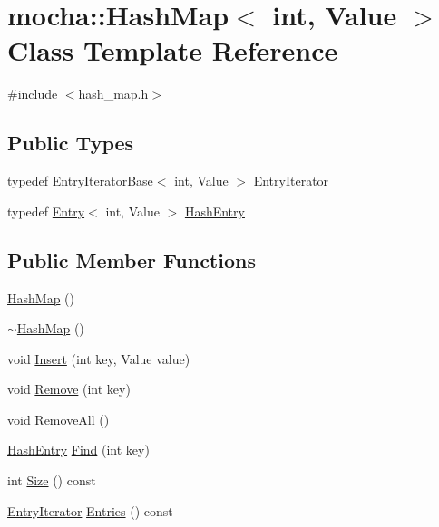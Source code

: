 \hypertarget{classmocha_1_1_hash_map_3_01int_00_01_value_01_4}{
\section{mocha::HashMap$<$ int, Value $>$ Class Template Reference}
\label{classmocha_1_1_hash_map_3_01int_00_01_value_01_4}
}


{\ttfamily \#include $<$hash\_\-map.h$>$}

\subsection*{Public Types}
\begin{DoxyCompactItemize}
\item 
typedef \hyperlink{classmocha_1_1_entry_iterator_base}{EntryIteratorBase}$<$ int, Value $>$ \hyperlink{classmocha_1_1_hash_map_3_01int_00_01_value_01_4_a9db157f397c8b5aa17afecf68c117d4b}{EntryIterator}
\item 
typedef \hyperlink{classmocha_1_1_entry}{Entry}$<$ int, Value $>$ \hyperlink{classmocha_1_1_hash_map_3_01int_00_01_value_01_4_a4b5cb184c5d22d42fe7eb555d983ca56}{HashEntry}
\end{DoxyCompactItemize}
\subsection*{Public Member Functions}
\begin{DoxyCompactItemize}
\item 
\hyperlink{classmocha_1_1_hash_map_3_01int_00_01_value_01_4_a107885712995ae0042fee33c0c1096c8}{HashMap} ()
\item 
\hyperlink{classmocha_1_1_hash_map_3_01int_00_01_value_01_4_a80cd34c393ad055d97f80a27d2c2d1fb}{$\sim$HashMap} ()
\item 
void \hyperlink{classmocha_1_1_hash_map_3_01int_00_01_value_01_4_ad72db773b80c4e8313727f32bec2a92a}{Insert} (int key, Value value)
\item 
void \hyperlink{classmocha_1_1_hash_map_3_01int_00_01_value_01_4_a0d692249cf3f36975186cd6a73a596ae}{Remove} (int key)
\item 
void \hyperlink{classmocha_1_1_hash_map_3_01int_00_01_value_01_4_aea11672c2e5006186f5d8ddf5ecc3e92}{RemoveAll} ()
\item 
\hyperlink{classmocha_1_1_entry}{HashEntry} \hyperlink{classmocha_1_1_hash_map_3_01int_00_01_value_01_4_ab67773b6c0409c50e420cd48f48e8239}{Find} (int key)
\item 
int \hyperlink{classmocha_1_1_hash_map_3_01int_00_01_value_01_4_ace8189e3a21e9a8e7567aa9c52d96f56}{Size} () const 
\item 
\hyperlink{classmocha_1_1_entry_iterator_base}{EntryIterator} \hyperlink{classmocha_1_1_hash_map_3_01int_00_01_value_01_4_aa15c06bbf407ac5bb0e8d035f8e04e1b}{Entries} () const 
\end{DoxyCompactItemize}
